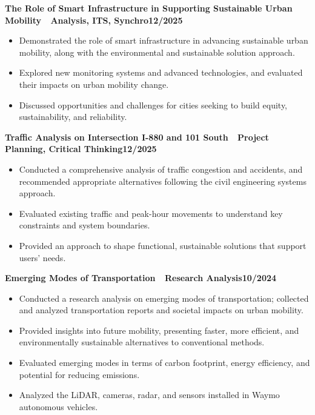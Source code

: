 \documentclass[9pt,letterpaper]{extarticle}
\newcommand{\sep}{\,\textbar\,}
\newcommand{\entry}[2]{\vspace{2pt}\textbf{#1}\hfill\textbf{#2}\par}
\begin{document}
\entry{The Role of Smart Infrastructure in Supporting Sustainable Urban Mobility \sep{} Analysis, ITS, Synchro}{12/2025}
\begin{itemize}
  \item Demonstrated the role of smart infrastructure in advancing sustainable urban mobility, along with the environmental and sustainable solution approach.
  \item Explored new monitoring systems and advanced technologies, and evaluated their impacts on urban mobility change.
  \item Discussed opportunities and challenges for cities seeking to build equity, sustainability, and reliability.
\end{itemize}

\entry{Traffic Analysis on Intersection I-880 and 101 South \sep{} Project Planning, Critical Thinking}{12/2025}
\begin{itemize}
  \item Conducted a comprehensive analysis of traffic congestion and accidents, and recommended appropriate alternatives following the civil engineering systems approach.
  \item Evaluated existing traffic and peak-hour movements to understand key constraints and system boundaries.
  \item Provided an approach to shape functional, sustainable solutions that support users' needs.
\end{itemize}

\entry{Emerging Modes of Transportation \sep{} Research Analysis}{10/2024}
\begin{itemize}
  \item Conducted a research analysis on emerging modes of transportation; collected and analyzed transportation reports and societal impacts on urban mobility.
  \item Provided insights into future mobility, presenting faster, more efficient, and environmentally sustainable alternatives to conventional methods.
  \item Evaluated emerging modes in terms of carbon footprint, energy efficiency, and potential for reducing emissions.
  \item Analyzed the LiDAR, cameras, radar, and sensors installed in Waymo autonomous vehicles.
\end{itemize}
\end{document}
